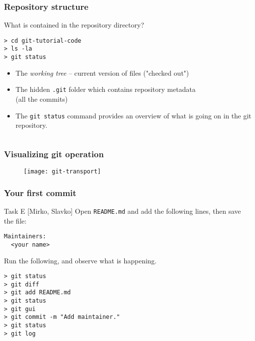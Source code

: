 
\begin{frame}[fragile]

\frametitle{Repository structure}

What is contained in the repository directory?
	
\begin{verbatim}
> cd git-tutorial-code
> ls -la
> git status
\end{verbatim}
	
\begin{itemize}
	\item The \textit{working tree} -- current version of files ("checked out")
	\item The hidden \texttt{.git} folder which contains repository metadata \\ (all the commits)
	\item The \texttt{git status} command provides an overview of what is going on in the git repository.
\end{itemize}
\begin{verbatim}
\end{verbatim}
	
\end{frame}


\begin{frame}
	\frametitle{Visualizing git operation}
	
	\begin{figure}
		\texttt{[image: git-transport]}
	\end{figure}
\end{frame}



\begin{frame}[fragile]
	\frametitle{Your first commit}
	
	\begin{block}{Task E [Mirko, Slavko]}
	Open \texttt{README.md} and add the following lines, then save the file:
	\begin{verbatim}
Maintainers:
  <your name>
	\end{verbatim}

Run the following, and observe what is happening.

	\begin{verbatim}
> git status
> git diff
> git add README.md
> git status
> git gui
> git commit -m "Add maintainer."
> git status
> git log
	\end{verbatim}
	
	\end{block}
	
\end{frame}

